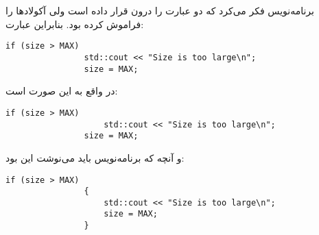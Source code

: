 \section{}
\paragraph{}\label{answer:4}
برنامه‌نویس فکر می‌کرد که دو عبارت را درون  قرار داده است ولی آکولادها را فراموش کرده بود. بنابراین عبارت:
\begin{LTR}
            \begin{lstlisting}[style=C++Style]
                if (size > MAX)
                std::cout << "Size is too large\n";
                size = MAX;
            \end{lstlisting}
\end{LTR}
در واقع به این صورت است:
\begin{LTR}
            \begin{lstlisting}[style=C++Style]
                if (size > MAX)
                    std::cout << "Size is too large\n";
                size = MAX;
            \end{lstlisting}
\end{LTR}
و آنچه که برنامه‌نویس باید می‌نوشت این بود:
\begin{LTR}
            \begin{lstlisting}[style=C++Style]
                if (size > MAX)
                {
                    std::cout << "Size is too large\n";
                    size = MAX;
                }
            \end{lstlisting}
\end{LTR}